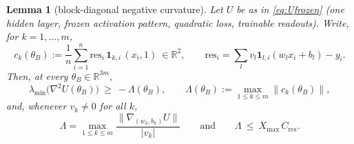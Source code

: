 \documentclass[11pt]{article}
\newtheorem{lemma}[theorem]{Lemma}
\theoremstyle{remark}
\newcommand{\R}{\mathbb{R}}
\newcommand{\res}{\mathrm{res}}
\newcommand{\Cres}{C_{\mathrm{res}}}
\newcommand{\Xmax}{X_{\max}}
\begin{document}
\begin{lemma}[block-diagonal negative curvature]\label{lem:curv}
Let $U$ be as in \eqref{eq:Ufrozen} (one hidden layer, frozen activation
pattern, quadratic loss, trainable readouts). Write, for $k=1,\dots,m$,
\begin{equation}\label{eq:ck}
c_k(\theta_B):=\frac1n\sum_{i=1}^n \res_i\,\mathbf1_{k,i}\,(x_i,1)\ \in\R^2,
\qquad \res_i=\sum_{l}v_l\mathbf1_{l,i}(w_lx_i+b_l)-y_i .
\end{equation}
Then, at every $\theta_B\in\R^{3m}$,
\begin{equation}\label{eq:curv}
\lambda_{\min}\bigl(\nabla^2U(\theta_B)\bigr)\ \ge\ -\Lambda(\theta_B),
\qquad
\Lambda(\theta_B):=\max_{1\le k\le m}\|c_k(\theta_B)\| ,
\end{equation}
and, whenever $v_k\neq0$ for all $k$,
\begin{equation}\label{eq:twoReadings}
\Lambda=\max_{1\le k\le m}\frac{\|\nabla_{(w_k,b_k)}U\|}{|v_k|}
\qquad\text{and}\qquad
\Lambda\ \le\ \Xmax\,\Cres .
\end{equation}
\end{lemma}
\end{document}
